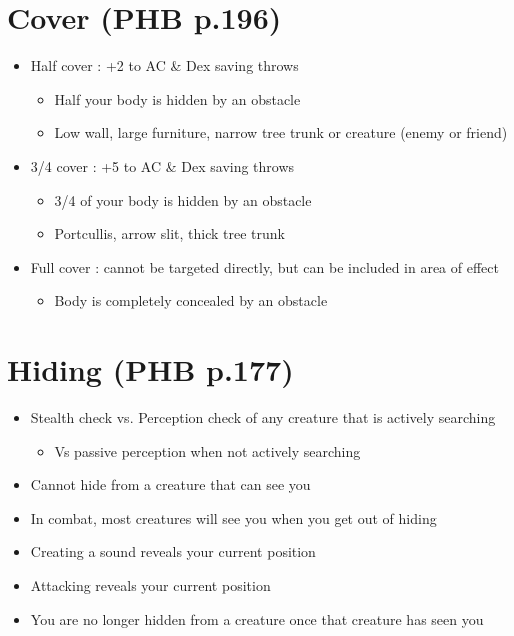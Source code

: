 \documentclass[a4paper]{article}
\begin{document}
\section{Cover \small (PHB p.196)}
\begin{itemize}
\item Half cover : +2 to AC \& Dex saving throws
	\begin{itemize}
	\item Half your body is hidden by an obstacle
	\item Low wall, large furniture, narrow tree trunk or creature (enemy or friend)
	\end{itemize} 
\item 3/4 cover : +5 to AC \& Dex saving throws
	\begin{itemize}
	\item 3/4 of your body is hidden by an obstacle
	\item Portcullis, arrow slit, thick tree trunk
	\end{itemize} 
\item Full cover : cannot be targeted directly, but can be included in area of effect
	\begin{itemize}
	\item Body is completely concealed by an obstacle
	\end{itemize} 
\end{itemize} 
\section{Hiding \small (PHB p.177)}
\begin{itemize}
\item Stealth check vs. Perception check of any creature that is actively searching
	\begin{itemize}
	\item Vs passive perception when not actively searching
	\end{itemize} 
\item Cannot hide from a creature that can see you
\item In combat, most creatures will see you when you get out of hiding
\item Creating a sound reveals your current position
\item Attacking reveals your current position
\item You are no longer hidden from a creature once that creature has seen you
\end{itemize} 
\end{document}
